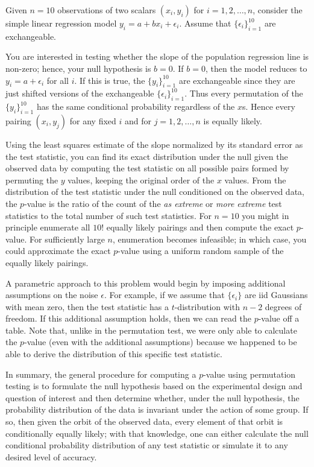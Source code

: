 \begin{example} Given $n=10$ observations of two scalars $(x_i, y_i)$ for
$i = 1, 2, \dots, n$, consider the simple linear regression model
$y_i = a + bx_i + \epsilon_i$.  Assume that $\{\epsilon_i\}_{i=1}^{10}$ are
exchangeable.

You are interested in testing whether the slope of the population regression line
is non-zero; hence, your null hypothesis is $b = 0$. If $b = 0$, then the model
reduces to $y_i = a + \epsilon_i$ for all $i$.  If this is true, the
$\{y_i\}_{i=1}^{10}$ are exchangeable since they are just shifted versions of the
exchangeable $\{\epsilon_i\}_{i=1}^{10}$.  Thus every permutation of the $\{y_i\}_{i=1}^{10}$ has the same
conditional probability regardless of the $x$s.  Hence every pairing
$(x_i, y_j)$ for any fixed $i$ and for $j = 1, 2, \dots, n$ is equally likely.

Using the least squares estimate of the slope normalized by its standard error
as the test statistic, you can find its exact distribution under the null given
the observed data by computing the test statistic on all possible pairs
formed by permuting the $y$ values, keeping the original order of the $x$ values.  From the distribution
of the test statistic under the null conditioned on the observed data, the
$p$-value is the ratio of the count of the \emph{as extreme} or \emph{more
extreme} test statistics to the total number of such test statistics. For
$n=10$ you might in principle enumerate all $10!$ equally likely pairings and then compute
the exact $p$-value.  For sufficiently large $n$, enumeration becomes infeasible;
in which case, you could approximate the exact $p$-value using a uniform random
sample of the equally likely pairings.

A parametric approach to this problem would begin by imposing additional
assumptions on the noise $\epsilon$.  For example, if we assume
that $\{\epsilon_i\}$ are iid Gaussians with mean zero, 
then the test statistic has a
$t$-distribution with $n-2$ degrees of freedom.  If this additional assumption
holds, then we can read the $p$-value off a table.  Note that, unlike in the
permutation test, we were only able to calculate the $p$-value (even with the
additional assumptions) because we happened to be able to derive the
distribution of this specific test statistic.
\end{example}

In summary, the general procedure for computing a $p$-value using permutation
testing is to formulate the null hypothesis based on the
experimental design and question of interest and then determine whether,
under the null hypothesis, the probability distribution of the data is invariant
under the action of some group. 
If so, then given the orbit of the observed data, every element of that
orbit is conditionally equally likely; with that knowledge,
one can either calculate the null conditional probability distribution
of any test statistic or simulate it to any desired level of accuracy. 

